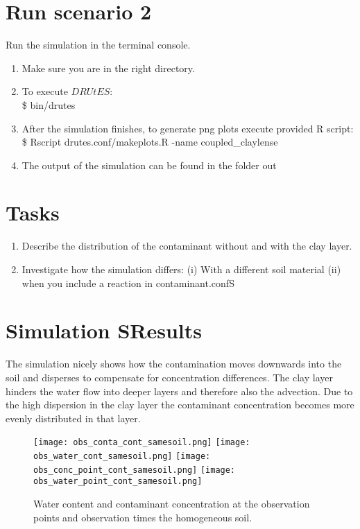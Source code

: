 \documentclass[
10pt, %
a4paper, %
oneside, %
headinclude,footinclude, %
BCOR5mm, %
]{scrartcl}
\begin{document}
\section*{Run scenario 2}
Run the simulation in the terminal console.
\begin{enumerate}
	\item Make sure you are in the right directory. 
	\item To execute $DRUtES$: \\
	\$ bin/drutes
	\item After the simulation finishes, to generate png plots execute provided R script: \\
	\$ Rscript drutes.conf/makeplots.R -name coupled\_claylense \\
	\item The output of the simulation can be found in the folder out
\end{enumerate}


\section*{Tasks}

\begin{enumerate}
\item Describe the distribution of the contaminant without and with the clay layer.
\item Investigate how the simulation differs: (i) With a different soil material (ii) when you include a reaction in contaminant.confS
\end{enumerate}

\newpage

\section*{Simulation SResults}

The simulation nicely shows how the contamination moves downwards into the soil and disperses to compensate for concentration differences. The clay layer hinders the water flow into deeper layers and therefore also the advection. Due to the high dispersion in the clay layer the contaminant concentration becomes more evenly distributed in that layer. 


\begin{figure}[!h]
	\centering
	\texttt{[image: obs\_conta\_cont\_samesoil.png]}
	\texttt{[image: obs\_water\_cont\_samesoil.png]}
	\texttt{[image: obs\_conc\_point\_cont\_samesoil.png]}
	\texttt{[image: obs\_water\_point\_cont\_samesoil.png]}
	\caption{Water content  and contaminant concentration at the observation points and observation times the homogeneous soil.}
\end{figure}
\end{document}
